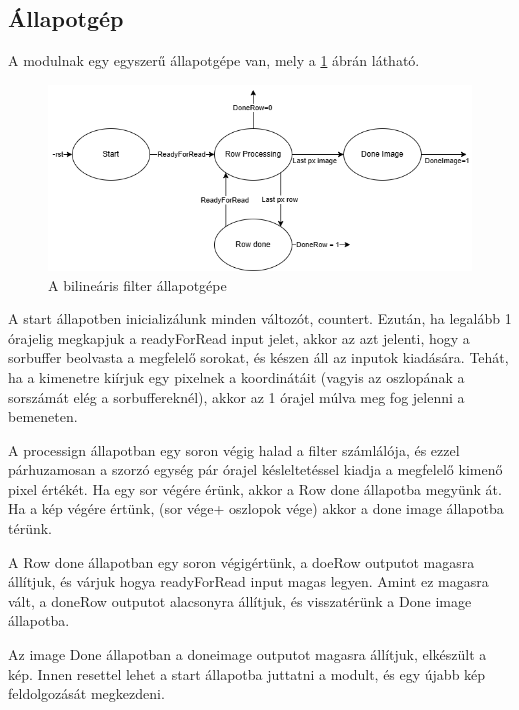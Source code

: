 \subsection{Állapotgép}

A modulnak egy egyszerű állapotgépe van, mely a \ref{pic:bilin_state} ábrán látható.

\begin{figure}[!ht]
	\centering
	\includegraphics[width=120mm, keepaspectratio]{figures/bilin_state.png}
	\caption{A bilineáris filter állapotgépe} 
	\label{pic:bilin_state}
\end{figure}

A start állapotben inicializálunk minden változót, countert. Ezután, ha legalább 1 órajelig megkapjuk a readyForRead input jelet, akkor az azt jelenti, hogy a sorbuffer beolvasta a megfelelő sorokat, és készen áll az inputok kiadására. Tehát, ha a kimenetre kiírjuk egy pixelnek a koordinátáit (vagyis az oszlopának a sorszámát elég a sorbuffereknél), akkor az 1 órajel múlva meg fog jelenni a bemeneten. 

A processign állapotban egy soron végig halad a filter számlálója, és ezzel párhuzamosan a szorzó egység pár órajel késleltetéssel kiadja a megfelelő kimenő pixel értékét. Ha egy sor végére érünk, akkor a Row done állapotba megyünk át. Ha a kép végére értünk, (sor vége+ oszlopok vége) akkor a done image állapotba térünk.

A Row done állapotban egy soron végigértünk, a doeRow outputot magasra állítjuk, és várjuk hogya readyForRead input magas legyen. Amint ez magasra vált, a doneRow outputot alacsonyra állítjuk, és visszatérünk a Done image állapotba.

Az image Done állapotban a doneimage outputot magasra állítjuk, elkészült a kép. Innen resettel lehet a start állapotba juttatni a modult, és egy újabb kép feldolgozását megkezdeni.

